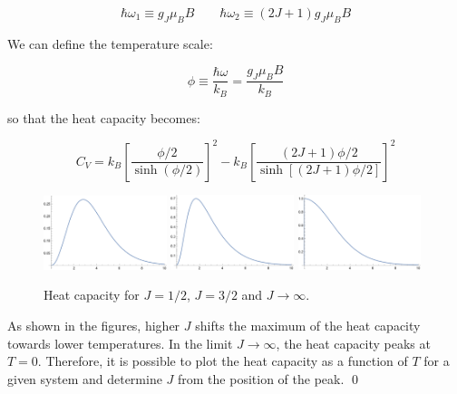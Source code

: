 \documentclass[12pt]{article}
\begin{document}
\begin{equation}
    \hbar \omega_{1} \equiv g_{J} \mu_{B} B \qquad \hbar \omega_{2} \equiv (2J + 1)g_{J} \mu_{B} B
\end{equation}

We can define the temperature scale:

\begin{equation}
    \phi \equiv \frac{\hbar \omega}{k_{B}} = \frac{g_{J} \mu_{B} B}{k_{B}}
\end{equation}

so that the heat capacity becomes:

\begin{equation}
    C_{V} = k_{B} \left[ \frac{\phi/2}{\sinh\left( \phi/2 \right)} \right]^{2} - k_{B} \left[ \frac{(2J + 1)\phi/2}{\sinh\left[ (2J + 1)\phi/2 \right]} \right]^{2}
\end{equation}

\begin{figure}[!h]
    \centering
    \includegraphics[width=0.32\textwidth]{../plots/statistics_2_4_a.png}
    \includegraphics[width=0.32\textwidth]{../plots/statistics_2_4_b.png}
    \includegraphics[width=0.32\textwidth]{../plots/statistics_2_4_c.png}
    \caption{Heat capacity for $J = 1/2$, $J = 3/2$ and $J \to \infty$.}
\end{figure}

As shown in the figures, higher $J$ shifts the maximum of the heat capacity towards lower temperatures. In the limit $J \to \infty$, the heat capacity peaks at $T = 0$. Therefore, it is possible to plot the heat capacity as a function of $T$ for a given system and determine $J$ from the position of the peak.
\qed
\end{document}
